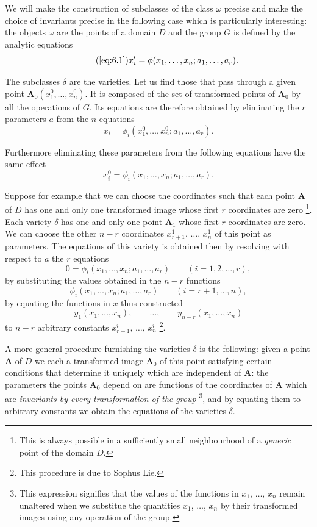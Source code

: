 \somespace
{\small
We will make the construction of subclasses of the class $\omega$ precise and make the choice of invariants precise in the following case which is particularly interesting: the objects $\omega$ are the points of a domain $D$ and the group $G$ is defined by the analytic equations
\begin{equation}
  \label{eq:6.1a}\tag{\ref{eq:6.1}}
  x'_{i}=\phi(x_{1},\dots,x_{n};a_{1},\dots,a_{r}).
\end{equation}

The subclasses $\delta$ are the varieties. Let us find those that pass through a given point $\mathbf{A}_{0}(x^{0}_{1},\dots,x^{0}_{n})$. It is composed of the set of transformed points of $\mathbf{A}_{0}$ by all the operations of $G$. Its equations are therefore obtained by eliminating the $r$ parameters $a$ from the $n$ equations
\[
x_{i}=\phi_{i}(x^{0}_{1},\dots,x^{0}_{n};a_{1},\dots,a_{r}).
\]

Furthermore eliminating these parameters from the following equations have the same effect
\[
x^{0}_{i}=\phi_{i}(x_{1},\dots,x_{n};a_{1},\dots,a_{r}).
\]

Suppose for example that we can choose the coordinates such that each point $\mathbf{A}$ of $D$ has one and only one transformed image whose first $r$ coordinates are zero \footnote{This is always possible in a sufficiently small neighbourhood of a \emph{generic} point of the domain $D$.}. Each variety $\delta$ has one and only one point $\mathbf{A}_{1}$ whose first $r$ coordinates are zero. We can choose the other $n-r$ coordinates $x^{1}_{r+1}$, $\dots$, $x^{1}_{n}$ of this point as parameters. The equations of this variety is obtained then by resolving with respect to $a$ the $r$ equations
\[
0=\phi_{i}(x_{1},\dots,x_{n};a_{1},\dots,a_{r})\qquad (i=1,2,\dots,r),
\]
by substituting the values obtained in the $n-r$ functions
\[
\phi_{i}(x_{1},\dots,x_{n};a_{1},\dots,a_{r})\qquad (i=r+1,\dots,n),
\]
by equating the functions in $x$ thus constructed
\[
y_{1}(x_{1},\dots,x_{n}),\qquad \dots,\qquad y_{n-r}(x_{1},\dots,x_{n})
\]
to $n-r$ arbitrary constants $x^{i}_{r+1}$, $\dots$, $x^{i}_{n}$ \footnote{This procedure is due to Sophus Lie.}.

A more general procedure furnishing the varieties $\delta$ is the following: given a point $\mathbf{A}$ of $D$ we each a transformed image $\mathbf{A}_{0}$ of this point satisfying certain conditions that determine it uniquely which are independent of $\mathbf{A}$: the parameters the points $\mathbf{A}_{0}$ depend on are functions of the coordinates of $\mathbf{A}$ which are \emph{invariants by every transformation of the group} \footnote{This expression signifies that the values of the functions in $x_{1}$, $\dots$, $x_{n}$ remain unaltered when we substitue the quantities $x_{1}$, $\dots$, $x_{n}$ by their transformed images using any operation of the group.}, and by equating them to arbitrary constants we obtain the equations of the varieties $\delta$.
}

